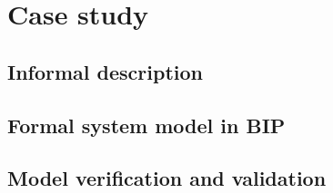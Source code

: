 
\section{Case study}


\subsection{Informal description}


\subsection{Formal system model in BIP}


\subsection{Model verification and validation}

